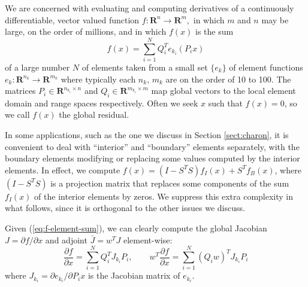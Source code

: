 \documentclass{llncs}
\newcommand{\field}[1]{{\mathbf{#1}}}
\begin{document}
We are concerned with evaluating and computing derivatives of a
continuously differentiable, vector valued function
$f: \field{R}^n \rightarrow \field{R}^m,$
in which $m$ and $n$ may be large,
on the order of millions, and in which $f(x)$ is the sum
\begin{equation}\label{eq:f-element-sum}
f(x) = \sum_{i=1}^{N} Q_i^T e_{k_i}(P_i x)
\end{equation}
of a large number $N$ of elements taken from a small
set $\{ e_k \}$ of element
functions $e_k : \field{R}^{n_k}\rightarrow\field{R}^{m_k}$ where
typically each $n_k$, $m_k$ are on the order of 10 to 100.
The matrices $P_i \in \field{R}^{n_{k_i} \times n}$
and $Q_i \in \field{R}^{m_{k_i} \times m}$ map global vectors
to the local element domain and range spaces respectively.
Often we seek
$x$ such that $f(x)=0$, so we call $f(x)$ the
global residual.

In some applications, such as the one we discuss in Section \ref{sect:charon},
it is convenient to
deal with ``interior'' and ``boundary'' elements separately, with the boundary
elements modifying or replacing some values computed by the interior elements.
In effect, we compute $f(x) = (I - S^T S) f_I(x) + S^T f_B(x)$, where
$(I - S^T S)$ is a projection matrix that replaces some components of the sum $f_I(x)$
of the interior elements by zeros.  We suppress this extra complexity in what follows,
since it is orthogonal to the other issues we discuss.

Given (\ref{eq:f-element-sum}), we can clearly compute
the global Jacobian $J = \partial f/\partial x$ and
adjoint $\bar{J} = w^T J$ element-wise:
\begin{equation*}
\frac{\partial f}{\partial x} = \sum_{i=1}^{N} Q_i^T J_{k_i} P_i, \qquad
w^T\frac{\partial f}{\partial x} = \sum_{i=1}^{N} (Q_i w)^T J_{k_i} P_i
\end{equation*}
where
$J_{k_i} = \partial e_{k_i}/\partial P_i x$ is the Jacobian
matrix of $e_{k_i}$.
\end{document}
